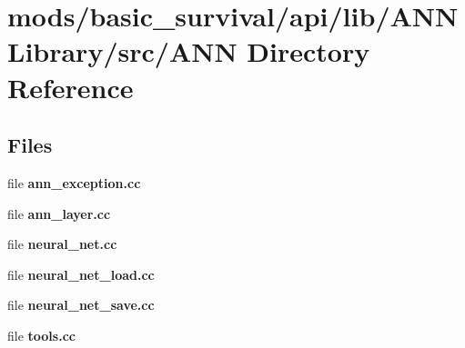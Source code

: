 \section{mods/basic\+\_\+survival/api/lib/\+A\+N\+N\+Library/src/\+A\+N\+N Directory Reference}
\label{dir_77a7fb4b0f9bf7c7e618afdc796f692a}
\subsection*{Files}
\begin{DoxyCompactItemize}
\item 
file {\bfseries ann\+\_\+exception.\+cc}
\item 
file {\bfseries ann\+\_\+layer.\+cc}
\item 
file {\bfseries neural\+\_\+net.\+cc}
\item 
file {\bfseries neural\+\_\+net\+\_\+load.\+cc}
\item 
file {\bfseries neural\+\_\+net\+\_\+save.\+cc}
\item 
file {\bfseries tools.\+cc}
\end{DoxyCompactItemize}
